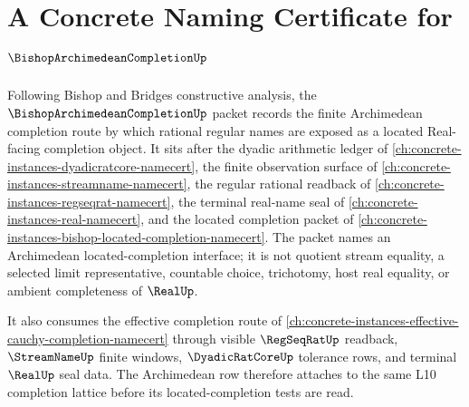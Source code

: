 \chapter{A Concrete Naming Certificate for $\BishopArchimedeanCompletionUp$}
\label{ch:concrete-instances-bishop-archimedean-completion-namecert}

Following Bishop and Bridges constructive analysis, the $\BishopArchimedeanCompletionUp$ packet records the finite Archimedean completion route by which rational regular names are exposed as a located Real-facing completion object. It sits after the dyadic arithmetic ledger of \autoref{ch:concrete-instances-dyadicratcore-namecert}, the finite observation surface of \autoref{ch:concrete-instances-streamname-namecert}, the regular rational readback of \autoref{ch:concrete-instances-regseqrat-namecert}, the terminal real-name seal of \autoref{ch:concrete-instances-real-namecert}, and the located completion packet of \autoref{ch:concrete-instances-bishop-located-completion-namecert}. The packet names an Archimedean located-completion interface; it is not quotient stream equality, a selected limit representative, countable choice, trichotomy, host real equality, or ambient completeness of $\RealUp$.

It also consumes the effective completion route of \autoref{ch:concrete-instances-effective-cauchy-completion-namecert} through visible $\RegSeqRatUp$ readback, $\StreamNameUp$ finite windows, $\DyadicRatCoreUp$ tolerance rows, and terminal $\RealUp$ seal data. The Archimedean row therefore attaches to the same L10 completion lattice before its located-completion tests are read.

